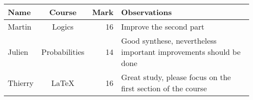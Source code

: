 \documentclass{article}
\begin{document}
\begin{tabular}{|l||c|r|p{4cm}|}
\hline
Name & Course & Mark & Observations \\
\hline
\hline
Martin & Logics & 16 & Improve the second part \\
\hline
Julien & Probabilities & 14 & Good synthese, nevertheless important improvements should be done\\
\hline
Thierry & LaTeX & 16 & Great study, please focus on the first section of the course\\
\hline
\end{tabular}
\end{document}
